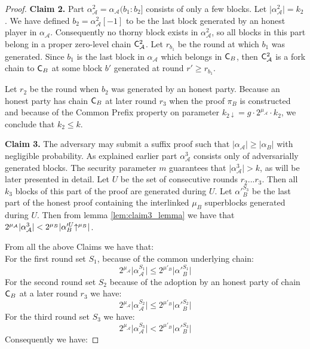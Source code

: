\begin{proof}
\textbf{Claim 2.}
Part $\alpha_\mathcal{A}^2 = \alpha_\mathcal{A}(b_1:b_2]$ consists of only a few blocks. Let $ \lvert \alpha_\mathcal{A}^2 \rvert = k_2$. We have defined $b_2 = \alpha_\mathcal{A}^2[-1]$ to be the last block generated by an honest player in $\alpha_\mathcal{A}$. Consequently no thorny block exists in $\alpha_\mathcal{A}^2$, so all blocks in this part belong in a proper zero-level chain $\mathsf{C}_\mathcal{A}^2$.  Let $r_{b_1}$ be the round at which $b_1$ was generated. Since $b_1$ is the last block in $\alpha_\mathcal{A}$ which belongs in $\mathsf{C}_B$, then $\mathsf{C}_\mathcal{A}^2$ is a fork chain to $\mathsf{C}_B$ at some block $b'$ generated at round $r' \geq r_{b_1}$.

Let $r_2$ be the round when $b_2$ was generated by an honest party. Because an honest party has chain $\mathsf{C}_B$ at later round $r_3$ when the proof $\pi_B$ is constructed and because of the Common Prefix property on parameter $k_{2\downarrow} = g \cdot 2^{\mu_\mathcal{A}} \cdot k_2$, we conclude that $k_2 \leq k$.

\textbf{Claim 3.} The adversary may submit a suffix proof such that $\lvert \alpha_\mathcal{A}\rvert \geq \lvert \alpha_B \rvert$ with negligible probability. As explained earlier part $\alpha^3_\mathcal{A}$ consists only of adversarially generated blocks. The security parameter $m$ guarantees that $\lvert \alpha^3_\mathcal{A} \rvert > k$, as will be later presented in detail. Let $U$ be the set of consecutive rounds $r_2...r_3$. Then all $k_3$ blocks of this part of the proof are generated during $U$. Let $\alpha'^{S_3}_B$ be the last part of the honest proof containing the interlinked $\mu_B$ superblocks generated during $U$. Then from lemma \ref{lem:claim3_lemma} we have that $ 2^{\mu_\mathcal{A}}\lvert \alpha^3_\mathcal{A} \rvert < 2^{\mu_B} \lvert \alpha'^U_{B}\negthickspace\uparrow^{\mu_B} \rvert $.

From all the above Claims we have that:\\
For the first round set $S_1$, because of the common underlying chain:
\begin{equation} \label{eq_v_round_set_1}
2^{\mu_\mathcal{A}} \lvert \alpha_\mathcal{A}^{S_1} \rvert \leq 2^{\mu'_B} \lvert \alpha'{_B^{S_1}} \rvert
\end{equation}
For the second round set $S_2$ because of the adoption by an honest party of chain $\mathsf{C}_B$ at a later round $r_3$ we have:
\begin{equation} \label{eq_v_round_set_2}
	2^{\mu_\mathcal{A}} \lvert \alpha_\mathcal{A}^{S_2} \rvert \leq 2^{\mu'_B} \lvert \alpha'{_B^{S_2}} \rvert
\end{equation}
For the third round set $S_3$ we have:
\begin{equation} \label{eq_v_round_set_3}
	2^{\mu_\mathcal{A}} \lvert \alpha_\mathcal{A}^{S_3} \rvert < 2^{\mu'_B} \lvert \alpha'{_B^{S_3}} \rvert
\end{equation}
Consequently we have:


\end{proof}
